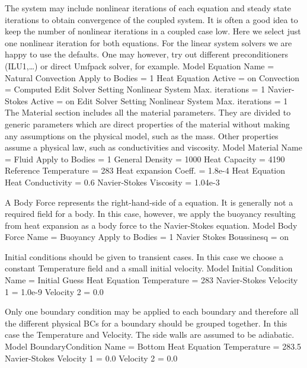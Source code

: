 The system may include nonlinear iterations of each equation and steady state iterations 
to obtain convergence of the coupled system. It is often a good idea to keep the number of 
nonlinear iterations in a coupled case low. Here we select just one nonlinear iteration
for both equations.
For the linear system solvers we are happy to use the defaults. One may however, try out different
preconditioners (ILU1,\ldots) or direct Umfpack solver, for example.
\ttbegin
Model
  Equation
    Name = Natural Convection
    Apply to Bodies = 1
    Heat Equation
      Active = on
      Convection = Computed
      Edit Solver Setting
        Nonlinear System
          Max. iterations = 1
    Navier-Stokes 
      Active = on
      Edit Solver Setting
        Nonlinear System
          Max. iterations = 1
\ttend        
The Material section includes all the material parameters.
They are divided to generic parameters which are direct properties of the material
without making any assumptions on the physical model, such as the mass. Other properties assume
a physical law, such as conductivities and viscosity.      
\ttbegin
Model
  Material
    Name = Fluid
    Apply to Bodies = 1 
    General    
      Density = 1000
      Heat Capacity = 4190
      Reference Temperature = 283
      Heat expansion Coeff. = 1.8e-4
    Heat Equation
      Heat Conductivity = 0.6
    Navier-Stokes
      Viscosity = 1.04e-3
\ttend

A Body Force represents the right-hand-side of a equation. It is generally 
not a required field for a body. In this case, however, we apply the buoyancy resulting from
heat expansion as a body force to the Navier-Stokes equation.
\ttbegin
Model
  Body Force
    Name = Buoyancy
    Apply to Bodies = 1
    Navier Stokes
      Boussinesq = on
\ttend    

Initial conditions should be given to transient cases. In this case we choose a constant Temperature field
and a small initial velocity. 
\ttbegin
Model
  Initial Condition 
    Name = Initial Guess
    Heat Equation
      Temperature = 283
    Navier-Stokes
      Velocity 1 = 1.0e-9
      Velocity 2 = 0.0
\ttend

Only one boundary condition may be applied to each boundary and therefore all the 
different physical BCs for a boundary should be grouped together. In this case the
Temperature and Velocity. The side walls are assumed to be adiabatic.
\ttbegin
Model
  BoundaryCondition
    Name = Bottom
    Heat Equation
      Temperature = 283.5
    Navier-Stokes 
      Velocity 1 = 0.0
      Velocity 2 = 0.0
 
